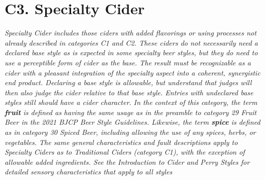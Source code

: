 \section*{C3. Specialty Cider}
\textit{Specialty Cider includes those ciders with added flavorings or using processes not already described in categories C1 and C2. These ciders do not necessarily need a declared base style as is expected in some specialty beer styles, but they do need to use a perceptible form of cider as the base. The result must be recognizable as a cider with a pleasant integration of the specialty aspect into a coherent, synergistic end product. Declaring a base style is allowable, but understand that judges will then also judge the cider relative to that base style. Entries with undeclared base styles still should have a cider character.}
\textit{In the context of this category, the term \textbf{fruit} is defined as having the same usage as in the preamble to category 29 Fruit Beer in the 2021 BJCP Beer Style Guidelines. Likewise, the term \textbf{spice} is defined as in category 30 Spiced Beer, including allowing the use of any spices, herbs, or vegetables.}
\textit{The same general characteristics and fault descriptions apply to Specialty Ciders as to Traditional Ciders (category C1), with the exception of allowable added ingredients. See the Introduction to Cider and Perry Styles for detailed sensory characteristics that apply to all styles}